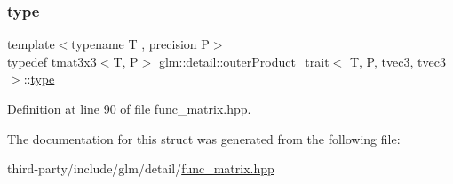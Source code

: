 \subsubsection{\texorpdfstring{type}{type}}
{\footnotesize\ttfamily template$<$typename T , precision P$>$ \\
typedef \hyperlink{structglm_1_1detail_1_1tmat3x3}{tmat3x3}$<$T, P$>$ \hyperlink{structglm_1_1detail_1_1outer_product__trait}{glm\+::detail\+::outer\+Product\+\_\+trait}$<$ T, P, \hyperlink{structglm_1_1detail_1_1tvec3}{tvec3}, \hyperlink{structglm_1_1detail_1_1tvec3}{tvec3} $>$\+::\hyperlink{structglm_1_1detail_1_1outer_product__trait_3_01_t_00_01_p_00_01tvec3_00_01tvec3_01_4_ac6a4ba81935840a9b4e4603f0bc0e222}{type}}



Definition at line 90 of file func\+\_\+matrix.\+hpp.



The documentation for this struct was generated from the following file\+:\begin{DoxyCompactItemize}
\item 
third-\/party/include/glm/detail/\hyperlink{func__matrix_8hpp}{func\+\_\+matrix.\+hpp}\end{DoxyCompactItemize}
